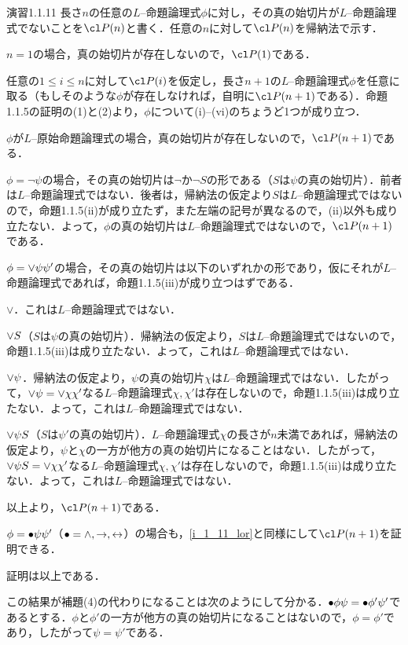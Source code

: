 \begin{excfield}{演習1.1.11}
  長さ$n$の任意の$L$--命題論理式$\phi$に対し，その真の始切片が$L$--命題論理式でないことを$\cl P (n)$と書く．任意の$n$に対して$\cl P (n)$を帰納法で示す．
  \begin{step}
    \item $n = 1$の場合，真の始切片が存在しないので，$\cl P (1)$である．
  \end{step}
  任意の$1 \le i \le n$に対して$\cl P (i)$を仮定し，長さ$n + 1$の$L$--命題論理式$\phi$を任意に取る（もしそのような$\phi$が存在しなければ，自明に$\cl P (n + 1)$である）．命題1.1.5の証明の(1)と(2)より，$\phi$について(i)--(vi)のちょうど1つが成り立つ．
  \begin{step}[resume]
    \item $\phi$が$L$--原始命題論理式の場合，真の始切片が存在しないので，$\cl P (n + 1)$である．
    \item $\phi = \lnot \psi$の場合，その真の始切片は$\lnot$か$\lnot S$の形である（$S$は$\psi$の真の始切片）．前者は$L$--命題論理式ではない．後者は，帰納法の仮定より$S$は$L$--命題論理式ではないので，命題1.1.5(ii)が成り立たず，また左端の記号が異なるので，(ii)以外も成り立たない．よって，$\phi$の真の始切片は$L$--命題論理式ではないので，$\cl P (n + 1)$である．
    \item \label{i_1_11_lor}
    $\phi = \mathord{\lor} \psi \psi'$の場合，その真の始切片は以下のいずれかの形であり，仮にそれが$L$--命題論理式であれば，命題1.1.5(iii)が成り立つはずである．
    \begin{step}
      \item $\lor$．これは$L$--命題論理式ではない．
      \item $\mathord{\lor} S$（$S$は$\psi$の真の始切片）．帰納法の仮定より，$S$は$L$--命題論理式ではないので，命題1.1.5(iii)は成り立たない．よって，これは$L$--命題論理式ではない．
      \item $\mathord{\lor} \psi$．帰納法の仮定より，$\psi$の真の始切片$\chi$は$L$--命題論理式ではない．したがって，$\mathord{\lor} \psi = \mathord{\lor} \chi \chi'$なる$L$--命題論理式$\chi, \chi'$は存在しないので，命題1.1.5(iii)は成り立たない．よって，これは$L$--命題論理式ではない．
      \item $\mathord{\lor} \psi S$（$S$は$\psi'$の真の始切片）．$L$--命題論理式$\chi$の長さが$n$未満であれば，帰納法の仮定より，$\psi$と$\chi$の一方が他方の真の始切片になることはない．したがって，$\mathord{\lor} \psi S = \mathord{\lor} \chi \chi'$なる$L$--命題論理式$\chi, \chi'$は存在しないので，命題1.1.5(iii)は成り立たない．よって，これは$L$--命題論理式ではない．
    \end{step}
    以上より，$\cl P (n + 1)$である．
    \item $\phi = \mathord{\bullet} \psi \psi'$（$\bullet = \mathord{\land}, \mathord{\rightarrow}, \mathord{\leftrightarrow}$）の場合も，\ref{i_1_11_lor}と同様にして$\cl P (n + 1)$を証明できる．
  \end{step}
  証明は以上である．

  この結果が補題(4)の代わりになることは次のようにして分かる．$\mathord{\bullet} \phi \psi = \mathord{\bullet} \phi' \psi'$であるとする．$\phi$と$\phi'$の一方が他方の真の始切片になることはないので，$\phi = \phi'$であり，したがって$\psi = \psi'$である．
\end{excfield}



